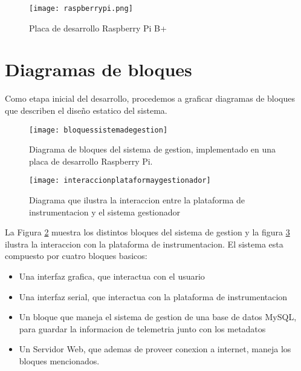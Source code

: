 \begin{figure}[h]
  \centering
  \texttt{[image: raspberrypi.png]}
  \caption{Placa de desarrollo Raspberry Pi B+}\label{fig:raspberrypi}
\end{figure}

\section{Diagramas de bloques} %
\label{it7:sec:diagramas_de_bloques}

Como etapa inicial del desarrollo, procedemos a graficar diagramas de bloques que describen el diseño estatico del sistema.

\begin{figure}[h]
  \centering
  \texttt{[image: bloquessistemadegestion]}
  \caption{Diagrama de bloques del sistema de gestion, implementado en una placa de desarrollo Raspberry Pi.}\label{fig:bloquessistemadegestion}
\end{figure}

\begin{figure}[h]
  \centering
  \texttt{[image: interaccionplataformaygestionador]}
  \caption{Diagrama que ilustra la interaccion entre la plataforma de instrumentacion y el sistema gestionador}\label{fig:interaccionplataformaygestionador}
\end{figure}

La Figura \ref{fig:bloquessistemadegestion} muestra los distintos bloques del sistema de gestion y la figura \ref{fig:interaccionplataformaygestionador} ilustra la interaccion con la plataforma de instrumentacion. El sistema esta compuesto por cuatro bloques basicos:

\begin{itemize}
  \item Una interfaz grafica, que interactua con el usuario
  \item Una interfaz serial, que interactua con la plataforma de instrumentacion
  \item Un bloque que maneja el sistema de gestion de una base de datos MySQL, para guardar la informacion de telemetria junto con los metadatos
  \item Un Servidor Web, que ademas de proveer conexion a internet, maneja los bloques mencionados.
\end{itemize}


